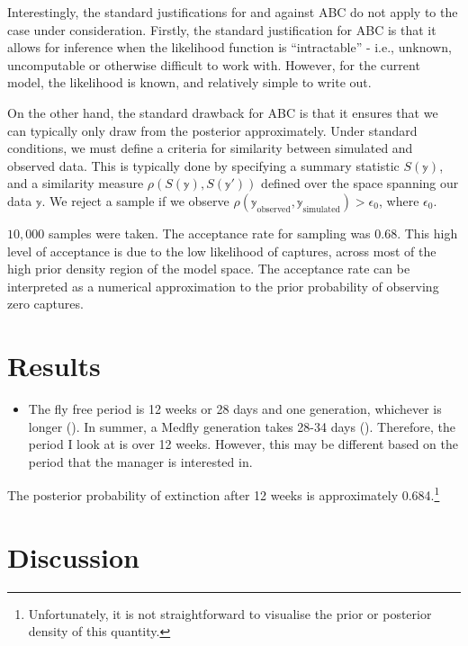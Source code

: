 \documentclass[
]{book}
\providecommand{\tightlist}{%
  \setlength{\itemsep}{0pt}\setlength{\parskip}{0pt}}
\begin{document}
Interestingly, the standard justifications for and against ABC do not apply to the case under consideration. Firstly, the standard justification for ABC is that it allows for inference when the likelihood function is ``intractable'' - i.e., unknown, uncomputable or otherwise difficult to work with. However, for the current model, the likelihood is known, and relatively simple to write out.

On the other hand, the standard drawback for ABC is that it ensures that we can typically only draw from the posterior approximately. Under standard conditions, we must define a criteria for similarity between simulated and observed data. This is typically done by specifying a summary statistic \(S(\mathbb y)\), and a similarity measure \(\rho(S(\mathbb y), S(\mathbb y'))\) defined over the space spanning our data \(\mathbb y\). We reject a sample if we observe \(\rho(\mathbb y_{\text{observed}}, \mathbb y_{\text{simulated}} ) > \epsilon_0\), where \(\epsilon_0\).

\(10{,}000\) samples were taken. The acceptance rate for sampling was 0.68. This high level of acceptance is due to the low likelihood of captures, across most of the high prior density region of the model space. The acceptance rate can be interpreted as a numerical approximation to the prior probability of observing zero captures.

\hypertarget{results}{%
\section{Results}\label{results}}

\begin{itemize}
\tightlist
\item
  The fly free period is 12 weeks or 28 days and one generation, whichever is longer (\citet{meats2005}). In summer, a Medfly generation takes 28-34 days (\citet{dpirdwa}). Therefore, the period I look at is over 12 weeks. However, this may be different based on the period that the manager is interested in.
\end{itemize}

The posterior probability of extinction after 12 weeks is approximately 0.684.\footnote{Unfortunately, it is not straightforward to visualise the prior or posterior density of this quantity.}

\hypertarget{discussion}{%
\section{Discussion}\label{discussion}}
\end{document}
